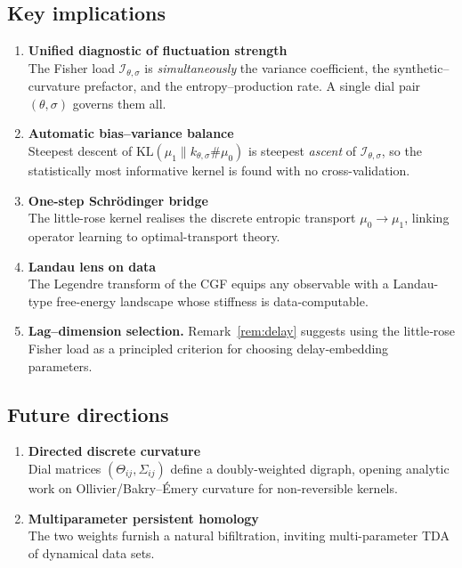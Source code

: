 \documentclass{article}
\begin{document}
	\subsection{Key implications}   %
		\begin{enumerate}[label=\textbf{(I\arabic*)},leftmargin=*]
 			\item \textbf{Unified diagnostic of fluctuation strength}\\ The Fisher load $\mathcal I_{\theta,\sigma}$ is \emph{simultaneously} the variance coefficient, the synthetic–curvature prefactor, and the entropy–production rate.  A single dial pair $(\theta, \sigma)$ governs them all.
			
			\item \textbf{Automatic bias–variance balance}\\ 
				Steepest descent of $\mathrm{KL}(\mu_1\parallel k_{\theta,\sigma}\!\#\mu_0)$ is steepest \emph{ascent} of $\mathcal I_{\theta,\sigma}$, so the statistically most informative kernel is found with no cross-validation.
			
			\item \textbf{One-step Schrödinger bridge}\\ 
				The little-rose kernel realises the discrete entropic transport $\mu_0\!\to\!\mu_1$, linking operator learning to optimal-transport theory.
			
			\item \textbf{Landau lens on data}\\
				The Legendre transform of the CGF equips any observable with a Landau-type free-energy landscape whose stiffness is data-computable.
				
			\item \textbf{Lag–dimension selection.}
      				Remark~\ref{rem:delay} suggests using the little‑rose Fisher load as a principled criterion for choosing delay‑embedding parameters.

		\end{enumerate}

	\subsection{Future directions}
		
		\begin{enumerate}[label=\textbf{(F\arabic*)},leftmargin=*]
 			
			 \item \textbf{Directed discrete curvature}\\
        				Dial matrices $(\Theta_{ij},\Sigma_{ij})$ define a doubly-weighted digraph, opening analytic work on Ollivier/Bakry–Émery curvature for non-reversible kernels.
				
			\item \textbf{Multiparameter persistent homology}\\
				The two weights furnish a natural bifiltration, inviting multi-parameter TDA of dynamical data sets.
		\end{enumerate}
\end{document}
